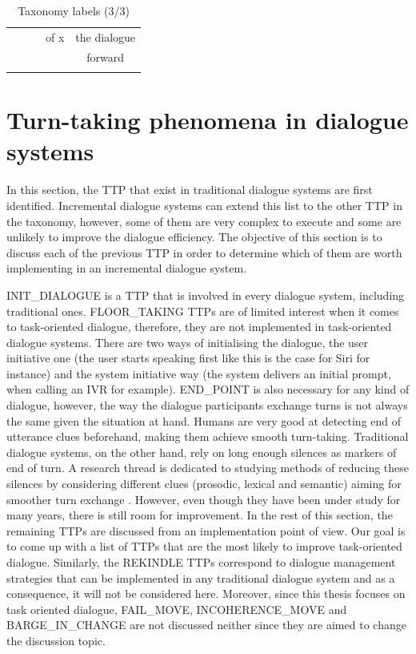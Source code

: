 \begin{table}[htp]
{\begin{tabular}{|c|c|c|c|c|}
                & & & of x & the dialogue \\
                & & & & forward \\
                & & & & \\
                \hline
       		\end{tabular}
       	}
        \caption{Taxonomy labels (3/3)}
        \label{tab:taxosynth3}
	\end{table}
		
	 \section{Turn-taking phenomena in dialogue systems}

                                In this section, the TTP that exist in traditional dialogue systems are first identified. Incremental dialogue systems can extend this list to the other TTP in the taxonomy, however, some of them are very complex to execute and some are unlikely to improve the dialogue efficiency. The objective of this section is to discuss each of the previous TTP in order to determine which of them are worth implementing in an incremental dialogue system.
	
				INIT\_DIALOGUE is a TTP that is involved in every dialogue system, including traditional ones. FLOOR\_TAKING TTPs are of limited interest when it comes to task-oriented dialogue, therefore, they are not implemented in task-oriented dialogue systems. There are two ways of initialising the dialogue, the user initiative one (the user starts speaking first like this is the case for Siri for instance) and the system initiative way (the system delivers an initial prompt, when calling an IVR for example). END\_POINT is also necessary for any kind of dialogue, however, the way the dialogue participants exchange turns is not always the same given the situation at hand. Humans are very good at detecting end of utterance clues beforehand, making them achieve smooth turn-taking. Traditional dialogue systems, on the other hand, rely on long enough silences as markers of end of turn. A research thread is dedicated to studying methods of reducing these silences by considering different clues (prosodic, lexical and semantic) aiming for smoother turn exchange \cite{Raux2008,Gravano2011}. However, even though they have been under study for many years, there is still room for improvement. In the rest of this section, the remaining TTPs are discussed from an implementation point of view. Our goal is to come up with a list of TTPs that are the most likely to improve task-oriented dialogue. Similarly, the REKINDLE TTPs correspond to dialogue management strategies that can be implemented in any traditional dialogue system and as a consequence, it will not be considered here. Moreover, since this thesis focuses on task oriented dialogue, FAIL\_MOVE, INCOHERENCE\_MOVE and BARGE\_IN\_CHANGE are not discussed neither since they are aimed to change the discussion topic.

